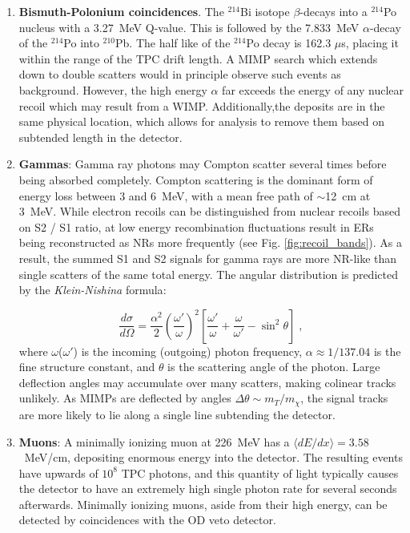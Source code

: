 \begin{enumerate}
    \item \textbf{Bismuth-Polonium coincidences}. The $^{214}$Bi isotope $\beta$-decays into a $^{214}$Po nucleus with a 3.27~MeV Q-value. This is followed by the 7.833~MeV $\alpha$-decay of the $^{214}$Po into $^{210}$Pb.
    The half like of the $^{214}$Po decay is 162.3 $\mu$s\cite{be_table_2016}, placing it within the range of the TPC drift length.
    A MIMP search which extends down to double scatters would in principle observe such events as background. 
    However, the high energy $\alpha$ far exceeds the energy of any nuclear recoil which may result from a WIMP.
    Additionally,the deposits are in the same physical location, which allows for analysis to remove them based on subtended length in the detector.
    
    \item \textbf{Gammas}: Gamma ray photons may Compton scatter several times before being absorbed completely. 
    Compton scattering is the dominant form of energy loss between 3 and 6~MeV\cite{berger_xcom_2010}, with a mean free path of $\sim$12~cm at 3~MeV.
    While electron recoils can be distinguished from nuclear recoils based on S2 / S1 ratio, at low energy recombination fluctuations result in ERs being reconstructed as NRs more frequently (see Fig. \ref{fig:recoil_bands}).
    As a result, the summed S1 and S2 signals for gamma rays are more NR-like than single scatters of the same total energy.
    The angular distribution is predicted by the \textit{Klein-Nishina} formula\cite{klein_uber_1929}:
    
    \begin{equation}
        \frac{d \sigma}{d \Omega} = \frac{\alpha^2}{2} (\frac{\omega ' }{\omega})^2 [\frac{\omega ' }{\omega} + \frac{\omega }{\omega'} - \sin^2 \theta]\;,
    \end{equation}
    \noindent
    where $\omega$($\omega '$) is the incoming (outgoing) photon frequency, $\alpha \approx 1/137.04$ is the fine structure constant, and $\theta$ is the scattering angle of the photon.
    Large deflection angles may accumulate over many scatters, making colinear tracks unlikely.
    As MIMPs are deflected by angles $\Delta \theta \sim m_T/m_\chi$, the signal tracks are more likely to lie along a single line subtending the detector.
    
    \item \textbf{Muons}: A minimally ionizing muon at 226~MeV has a $\langle dE / dx\rangle = 3.58$~MeV/cm, depositing enormous energy into the detector.
    The resulting events have upwards of $10^8$ TPC photons, and this quantity of light typically causes the detector to have an extremely high single photon rate for several seconds afterwards.
    Minimally ionizing muons, aside from their high energy, can be detected by coincidences with the OD veto detector.
    

\end{enumerate}
